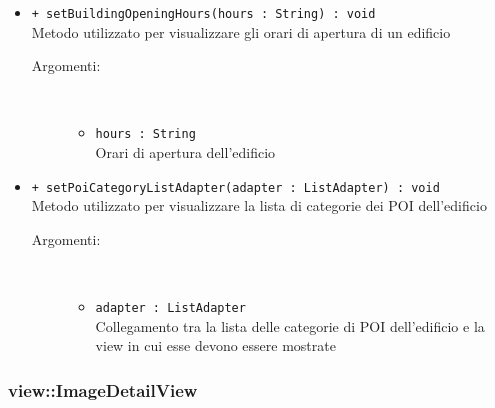 \documentclass[../DefinizioneDiProdotto.tex]{subfiles}
\begin{document}
\begin{description}
\begin{itemize}
\begin{description}
\end{description}
\item \texttt{+ setBuildingOpeningHours(hours : String) : void}\\
Metodo utilizzato per visualizzare gli orari di apertura di un edificio
 \begin{description}
\item[Argomenti:] \
\begin{itemize}
\item \texttt{hours : String}\\
Orari di apertura dell'edificio\end{itemize}
\end{description}
\item \texttt{+ setPoiCategoryListAdapter(adapter : ListAdapter) : void}\\
Metodo utilizzato per visualizzare la lista di categorie dei POI dell'edificio
 \begin{description}
\item[Argomenti:] \
\begin{itemize}
\item \texttt{adapter : ListAdapter}\\
Collegamento tra la lista delle categorie di POI dell'edificio e la view in cui esse devono essere mostrate\end{itemize}
\end{description}
\end{itemize}
\end{description}

\subsubsection{view::ImageDetailView}
\end{document}
